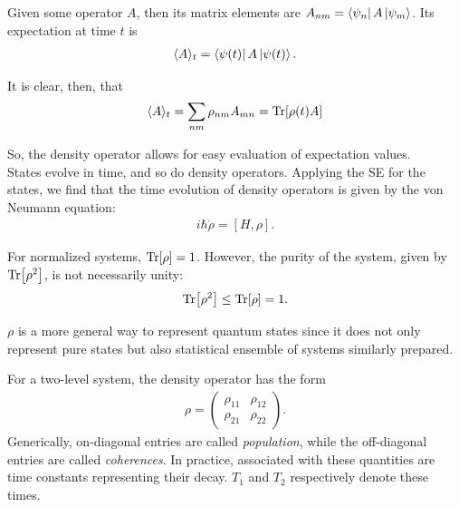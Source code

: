 \documentclass{book}
\theoremstyle{definition}
\begin{document}
Given some operator $A$, then its matrix elements are $A_{nm} = \bra{\psi_n} A \ket{\psi_m}$. Its expectation at time $t$ is 
\begin{align*}
	\langle A \rangle_t = \bra{\psi(t)} A \ket{\psi(t)}. 
\end{align*}

It is clear, then, that
\begin{align*}
	\langle A \rangle_t = \sum_{nm} \rho_{nm}A_{mn} = \Tr[\rho(t) A]
\end{align*}

So, the density operator allows for easy evaluation of expectation values. \\

States evolve in time, and so do density operators. Applying the SE for the states, we find that the time evolution of density operators is given by the von Neumann equation:
\begin{align*}
	i\hbar \dot \rho = [H,\rho].
\end{align*}


For normalized systems, $\Tr[\rho] = 1$. However, the purity of the system, given by $\Tr[\rho^2]$, is not necessarily unity:
\begin{align*}
	\Tr[\rho^2] \leq \Tr[\rho] = 1.
\end{align*}

$\rho$ is a more general way to represent quantum states since it does not only represent pure states but also statistical ensemble of systems similarly prepared. 

For a two-level system, the density operator has the form
\begin{align*}
	\rho = \begin{pmatrix}
		\rho_{11} & \rho_{12} \\ \rho_{21} & \rho_{22}
	\end{pmatrix}.
\end{align*}
Generically, on-diagonal entries are called \textit{population}, while the off-diagonal entries are called \textit{coherences}. In practice, associated with these quantities are time constants representing their decay. $T_1$ and $T_2$ respectively denote these times. \\
\end{document}

